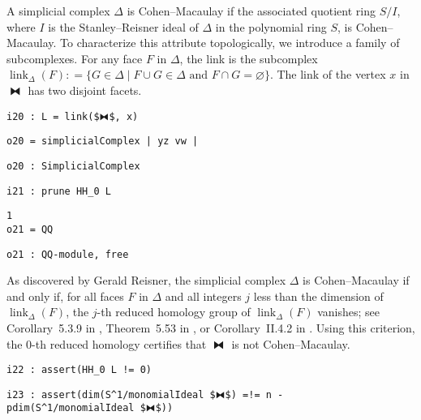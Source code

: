 \documentclass[12pt,leqno]{amsart}
\theoremstyle{definition}
\newcommand{\colequal}{\ensuremath{:\!=}}
\begin{document}
A simplicial complex $\Delta$ is Cohen--Macaulay if the associated quotient
ring $S/I$, where $I$ is the Stanley--Reisner ideal of $\Delta$ in the
polynomial ring $S$, is Cohen--Macaulay.  To characterize this attribute
topologically, we introduce a family of subcomplexes.  For any face $F$ in
$\Delta$, the link is the subcomplex
$\operatorname{link}_\Delta(F) \colequal \{ G \in \Delta \mathrel{|}
\text{$F \cup G \in \Delta$ and $F \cap G = \varnothing$} \}$.  The link of
the vertex $x$ in $⧓$ has two disjoint facets.
\begin{lstlisting}[xleftmargin=10pt, aboveskip=3.0pt, belowskip=1.5pt]
i20 : L = link($⧓$, x)
\end{lstlisting}
\begin{lstlisting}[xleftmargin=10pt, aboveskip=1.5pt, belowskip=1.5pt]
o20 = simplicialComplex | yz vw |
\end{lstlisting}
\begin{lstlisting}[xleftmargin=10pt, aboveskip=1.5pt, belowskip=1.5pt]
o20 : SimplicialComplex
\end{lstlisting}
\begin{lstlisting}[xleftmargin=10pt, aboveskip=1.5pt, belowskip=1.5pt]
i21 : prune HH_0 L
\end{lstlisting}
\begin{lstlisting}[xleftmargin=10pt, lineskip=-10pt, aboveskip=4pt, belowskip=1pt]
        1
o21 = QQ
\end{lstlisting}
\begin{lstlisting}[xleftmargin=10pt, aboveskip=1.5pt, belowskip=3.0pt]
o21 : QQ-module, free
\end{lstlisting}
As discovered by Gerald Reisner, the simplicial complex $\Delta$ is
Cohen--Macaulay if and only if, for all faces $F$ in $\Delta$ and all integers
$j$ less than the dimension of $\operatorname{link}_\Delta(F)$, the $j$-th
reduced homology group of $\operatorname{link}_\Delta(F)$ vanishes; see
Corollary~5.3.9 in \cite{BH}, Theorem~5.53 in \cite{MS}, or Corollary~II.4.2
in \cite{Stanley}.  Using this criterion, the $0$-th reduced homology
certifies that $⧓$ is not Cohen--Macaulay.
\begin{lstlisting}[xleftmargin=10pt, aboveskip=3.0pt, belowskip=1.5pt]
i22 : assert(HH_0 L != 0)
\end{lstlisting}
\begin{lstlisting}[xleftmargin=10pt, aboveskip=1.5pt, belowskip=3.0pt]
i23 : assert(dim(S^1/monomialIdeal $⧓$) =!= n - pdim(S^1/monomialIdeal $⧓$))
\end{lstlisting}
\end{document}
